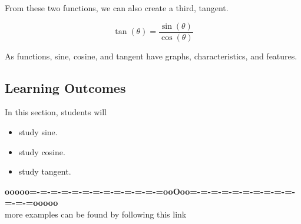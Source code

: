 \documentclass{ximera}
\begin{document}
From these two functions, we can also create a third, tangent.

\[       
\tan(\theta) = \frac{\sin(\theta)}{\cos(\theta)}
\]



As functions, sine, cosine, and tangent have graphs, characteristics, and features.



















\subsection{Learning Outcomes}


\begin{sectionOutcomes}
In this section, students will 

\begin{itemize}
\item study sine.
\item study cosine.
\item study tangent.
\end{itemize}
\end{sectionOutcomes}

















\begin{center}
\textbf{\textcolor{green!50!black}{ooooo=-=-=-=-=-=-=-=-=-=-=-=-=ooOoo=-=-=-=-=-=-=-=-=-=-=-=-=ooooo}} \\

more examples can be found by following this link\\ 

\end{center}
\end{document}

